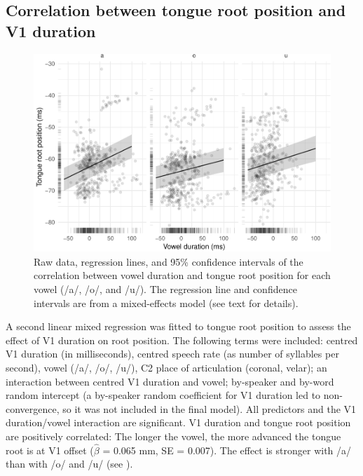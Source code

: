 \documentclass[12pt,]{article}
\begin{document}
\hypertarget{correlation-between-tongue-root-position-and-v1-duration}{%
\subsection{Correlation between tongue root position and V1
duration}\label{correlation-between-tongue-root-position-and-v1-duration}}

\label{s:trp-vdur}

\begin{figure}
\includegraphics[width=\linewidth]{2018-tra_files/figure-latex/tra-lm-2-plot-1} \caption{Raw data, regression lines, and 95\% confidence intervals of the correlation between vowel duration and tongue root position for each vowel (/a/, /o/, and /u/). The regression line and confidence intervals are from a mixed-effects model (see text for details).}\label{f:tra-lm-2-plot}
\end{figure}

A second linear mixed regression was fitted to tongue root position to
assess the effect of V1 duration on root position. The following terms
were included: centred V1 duration (in milliseconds), centred speech
rate (as number of syllables per second), vowel (/a/, /o/, /u/), C2
place of articulation (coronal, velar); an interaction between centred
V1 duration and vowel; by-speaker and by-word random intercept (a
by-speaker random coefficient for V1 duration led to non-convergence, so
it was not included in the final model). All predictors and the V1
duration/vowel interaction are significant. V1 duration and tongue root
position are positively correlated: The longer the vowel, the more
advanced the tongue root is at V1 offset (\(\hat{\beta}\) = 0.065 mm, SE
= 0.007). The effect is stronger with /a/ than with /o/ and /u/ (see
).
\end{document}
